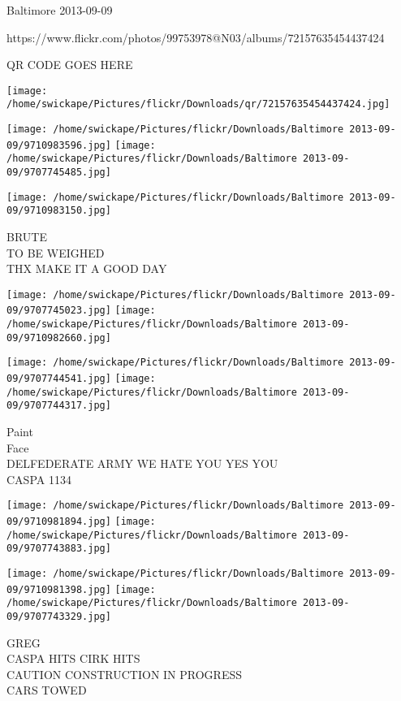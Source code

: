 \documentclass[10pt,letterpaper]{article}
\begin{document}
Baltimore 2013-09-09

https://www.flickr.com/photos/99753978@N03/albums/72157635454437424

QR CODE GOES HERE

\texttt{[image: /home/swickape/Pictures/flickr/Downloads/qr/72157635454437424.jpg]}
\pagebreak

\texttt{[image: /home/swickape/Pictures/flickr/Downloads/Baltimore 2013-09-09/9710983596.jpg]}
\texttt{[image: /home/swickape/Pictures/flickr/Downloads/Baltimore 2013-09-09/9707745485.jpg]}

\vspace{0.25in}
\texttt{[image: /home/swickape/Pictures/flickr/Downloads/Baltimore 2013-09-09/9710983150.jpg]}

BRUTE\\
TO BE WEIGHED\\
THX MAKE IT A GOOD DAY\\
\pagebreak

\texttt{[image: /home/swickape/Pictures/flickr/Downloads/Baltimore 2013-09-09/9707745023.jpg]}
\texttt{[image: /home/swickape/Pictures/flickr/Downloads/Baltimore 2013-09-09/9710982660.jpg]}

\texttt{[image: /home/swickape/Pictures/flickr/Downloads/Baltimore 2013-09-09/9707744541.jpg]}
\texttt{[image: /home/swickape/Pictures/flickr/Downloads/Baltimore 2013-09-09/9707744317.jpg]}

Paint\\
Face\\
DELFEDERATE ARMY WE HATE YOU YES YOU\\
CASPA 1134\\
\pagebreak

\texttt{[image: /home/swickape/Pictures/flickr/Downloads/Baltimore 2013-09-09/9710981894.jpg]}
\texttt{[image: /home/swickape/Pictures/flickr/Downloads/Baltimore 2013-09-09/9707743883.jpg]}

\texttt{[image: /home/swickape/Pictures/flickr/Downloads/Baltimore 2013-09-09/9710981398.jpg]}
\texttt{[image: /home/swickape/Pictures/flickr/Downloads/Baltimore 2013-09-09/9707743329.jpg]}

GREG\\
CASPA HITS CIRK HITS\\
CAUTION CONSTRUCTION IN PROGRESS\\
CARS TOWED\\
\pagebreak
\end{document}
